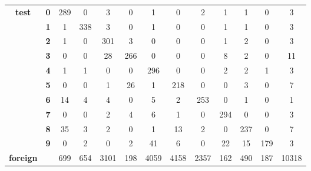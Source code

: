 \begin{table}[htp]
\begin{tabular}{|c|c|c|c|c|c|c|c|c|c|c|c|c|}
		\multirow{10}{*}{\textbf{test}}     & \textbf{0} & 289        & 0          & 3          & 0          & 1          & 0          & 2          & 1          & 1          & 0          & 3                \\ \cline{2-13} 
		& \textbf{1} & 1          & 338        & 3          & 0          & 1          & 0          & 0          & 1          & 1          & 0          & 3                \\ \cline{2-13} 
		& \textbf{2} & 1          & 0          & 301        & 3          & 0          & 0          & 0          & 1          & 2          & 0          & 3                \\ \cline{2-13} 
		& \textbf{3} & 0          & 0          & 28         & 266        & 0          & 0          & 0          & 8          & 2          & 0          & 11               \\ \cline{2-13} 
		& \textbf{4} & 1          & 1          & 0          & 0          & 296        & 0          & 0          & 2          & 2          & 1          & 3                \\ \cline{2-13} 
		& \textbf{5} & 0          & 0          & 1          & 26         & 1          & 218        & 0          & 0          & 3          & 0          & 7                \\ \cline{2-13} 
		& \textbf{6} & 14         & 4          & 4          & 0          & 5          & 2          & 253        & 0          & 1          & 0          & 1                \\ \cline{2-13} 
		& \textbf{7} & 0          & 0          & 2          & 4          & 6          & 1          & 0          & 294        & 0          & 0          & 3                \\ \cline{2-13} 
		& \textbf{8} & 35         & 3          & 2          & 0          & 1          & 13         & 2          & 0          & 237        & 0          & 7                \\ \cline{2-13} 
		& \textbf{9} & 0          & 2          & 0          & 2          & 41         & 6          & 0          & 22         & 15         & 179        & 3                \\ \hline
		\textbf{foreign}                    & \textbf{}  & 699        & 654        & 3101       & 198        & 4059       & 4158       & 2357       & 162        & 490        & 187        & 10318            \\ \hline
	\end{tabular}
\end{table}

